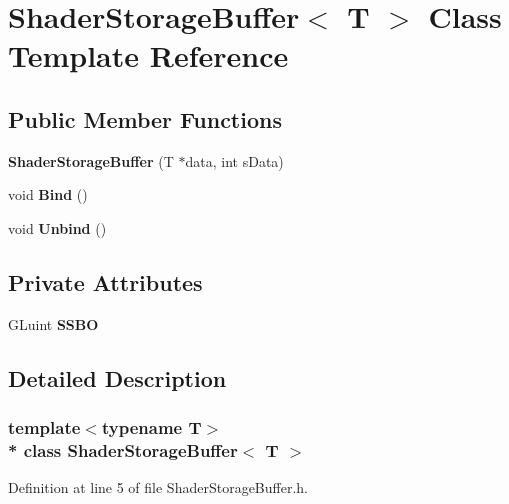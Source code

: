 \hypertarget{class_shader_storage_buffer}{}\section{Shader\+Storage\+Buffer$<$ T $>$ Class Template Reference}
\label{class_shader_storage_buffer}
\subsection*{Public Member Functions}
\begin{DoxyCompactItemize}
\item 
{\bfseries Shader\+Storage\+Buffer} (T $\ast$data, int s\+Data)\hypertarget{class_shader_storage_buffer_a28c1b79a425b55981535986d101aa799}{}\label{class_shader_storage_buffer_a28c1b79a425b55981535986d101aa799}

\item 
void {\bfseries Bind} ()\hypertarget{class_shader_storage_buffer_abdd3e61cfb984c0e0dd2dde72e91e428}{}\label{class_shader_storage_buffer_abdd3e61cfb984c0e0dd2dde72e91e428}

\item 
void {\bfseries Unbind} ()\hypertarget{class_shader_storage_buffer_ab615761a78b2860dafcd1b42b1cd921f}{}\label{class_shader_storage_buffer_ab615761a78b2860dafcd1b42b1cd921f}

\end{DoxyCompactItemize}
\subsection*{Private Attributes}
\begin{DoxyCompactItemize}
\item 
G\+Luint {\bfseries S\+S\+BO}\hypertarget{class_shader_storage_buffer_abeea528e9d31233a63952fa433a0df84}{}\label{class_shader_storage_buffer_abeea528e9d31233a63952fa433a0df84}

\end{DoxyCompactItemize}


\subsection{Detailed Description}
\subsubsection*{template$<$typename T$>$\\*
class Shader\+Storage\+Buffer$<$ T $>$}



Definition at line 5 of file Shader\+Storage\+Buffer.\+h.

